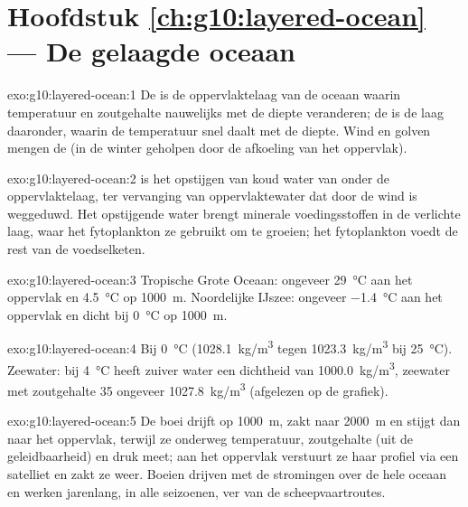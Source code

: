 \section*{Hoofdstuk \ref{ch:g10:layered-ocean} --- De gelaagde oceaan}

\begin{solution}{exo:g10:layered-ocean:1}
De  is de oppervlaktelaag van de oceaan waarin temperatuur en
zoutgehalte nauwelijks met de diepte veranderen; de  is de laag
daaronder, waarin de temperatuur snel daalt met de diepte. Wind en golven mengen
de  (in de winter geholpen door de afkoeling van het oppervlak).
\end{solution}

\begin{solution}{exo:g10:layered-ocean:2}
 is het opstijgen van koud water van onder de oppervlaktelaag, ter
vervanging van oppervlaktewater dat door de wind is weggeduwd. Het opstijgende
water brengt minerale voedingsstoffen in de verlichte laag, waar het
fytoplankton ze gebruikt om te groeien; het fytoplankton voedt de rest van de
voedselketen.
\end{solution}

\begin{solution}{exo:g10:layered-ocean:3}
Tropische Grote Oceaan: ongeveer \qty{29}{\degreeCelsius} aan het oppervlak en
\qty{4.5}{\degreeCelsius} op \qty{1000}{m}. Noordelijke IJszee: ongeveer
\qty{-1.4}{\degreeCelsius} aan het oppervlak en dicht bij
\qty{0}{\degreeCelsius} op \qty{1000}{m}.
\end{solution}

\begin{solution}{exo:g10:layered-ocean:4}
Bij \qty{0}{\degreeCelsius} (\qty{1028.1}{kg/m^3} tegen \qty{1023.3}{kg/m^3}
bij \qty{25}{\degreeCelsius}). Zeewater: bij \qty{4}{\degreeCelsius} heeft
zuiver water een dichtheid van \qty{1000.0}{kg/m^3}, zeewater met zoutgehalte
35 ongeveer \qty{1027.8}{kg/m^3} (afgelezen op de grafiek).
\end{solution}

\begin{solution}{exo:g10:layered-ocean:5}
De boei drijft op \qty{1000}{m}, zakt naar \qty{2000}{m} en stijgt dan naar het
oppervlak, terwijl ze onderweg temperatuur, zoutgehalte (uit de geleidbaarheid)
en druk meet; aan het oppervlak verstuurt ze haar profiel via een satelliet en
zakt ze weer. Boeien drijven met de stromingen over de hele oceaan en werken
jarenlang, in alle seizoenen, ver van de scheepvaartroutes.
\end{solution}

